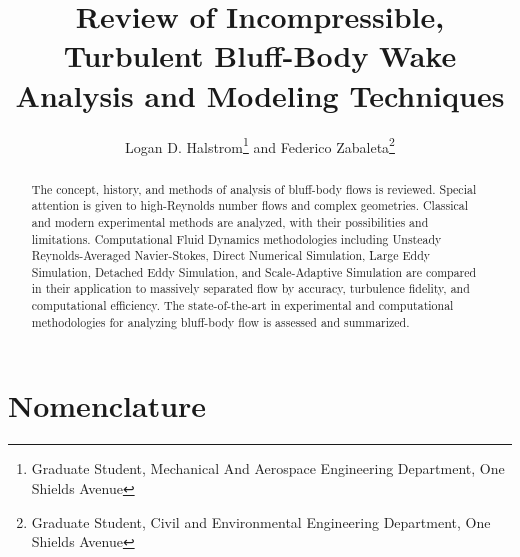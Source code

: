 \documentclass[journal]{new-aiaa}
\title{Review of Incompressible, Turbulent Bluff-Body Wake Analysis and Modeling Techniques}
\author{Logan D. Halstrom\footnote{Graduate Student, Mechanical And Aerospace Engineering Department, One Shields Avenue} and Federico Zabaleta\footnote{Graduate Student, Civil and Environmental Engineering Department, One Shields Avenue}}
\affil{University of California, Davis, California, 95616}
\begin{document}
\maketitle

\begin{abstract} %

The concept, history, and methods of analysis of bluff-body flows is reviewed. Special attention is given to high-Reynolds number flows and complex geometries. Classical and modern experimental methods are analyzed, with their possibilities and limitations. Computational Fluid Dynamics methodologies including Unsteady Reynolds-Averaged Navier-Stokes, Direct Numerical Simulation, Large Eddy Simulation, Detached Eddy Simulation, and Scale-Adaptive Simulation are compared in their application to massively separated flow by accuracy, turbulence fidelity, and computational efficiency. The state-of-the-art in experimental and computational methodologies for analyzing bluff-body flow is assessed and summarized.

\end{abstract}



\section*{Nomenclature} %
\end{document}
